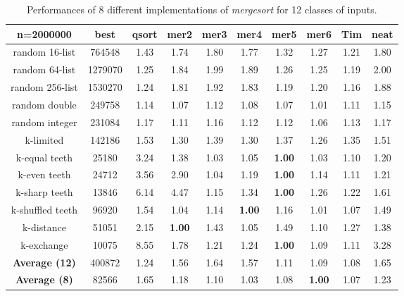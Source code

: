 \documentclass[AMA,STIX1COL]{WileyNJD-v2}
\newcommand{\msort}{\emph{mergesort }}
\begin{document}
\begin{table}
\caption{Performances of 8 different implementations of \msort for 12 classes of inputs.}
\centering
\begin{tabular}{|c|c|c|c|c|c|c|c|c|c|}
\toprule
n=2000000 & best  & qsort & mer2 & mer3 & mer4 & mer5 & mer6 & Tim & neat\\
\midrule
random 16-list	&764548&	1.43&	1.74&	1.80&	1.77&	1.32&	1.27&	1.21&	1.80\\
random 64-list&	1279070&	1.25&	1.84&	1.99&	1.89&	1.26&	1.25&	1.19&	2.00\\
random 256-list&	1530270&	1.24&	1.81&	1.92&	1.83&	1.19&	1.20&	1.16&	1.88\\
random double&	249758&	1.14&	1.07&	1.12&	1.08&	1.07&	1.01&	1.11&	1.15\\
random integer&	231084&	1.17&	1.11&	1.16&	1.12&	1.12&	1.06&	1.13&	1.17\\
k-limited&	142186&	1.53&	1.30&	1.39&	1.30&	1.37&	1.26&	1.35&	1.51\\
k-equal teeth&	25180&	3.24&	1.38&	1.03&	1.05&	\textbf{1.00}&	1.03&	1.10&	1.20\\
k-even teeth&	24712&	3.56&	2.90&	1.04&	1.19&	\textbf{1.00}&	1.14&	1.11&	1.21\\
k-sharp teeth&	13846&	6.14&	4.47&	1.15&	1.34&	\textbf{1.00}&	1.26&	1.22&	1.61\\
k-shuffled teeth&	96920&	1.54&	1.04&	1.14&	\textbf{1.00}&	1.16&	1.01&	1.07&	1.49\\
k-distance&	51051&	2.15&	\textbf{1.00}&	1.43&	1.05&	1.49&	1.10&	1.27&	1.38\\
k-exchange&	10075&	8.55&	1.78&	1.21&	1.24&	\textbf{1.00}&	1.09&	1.11&	3.28\\
\textbf{Average  (12)}&	400872&	1.24&	1.56&	1.64&	1.57&	1.11&	1.09&	1.08&	1.65\\
\textbf{Average  (8)}&	82566&	1.65&	1.18&	1.10&	1.03&	1.08&	\textbf{1.00}&	1.07&	1.23\\

\bottomrule
\end{tabular}
\label{table2}
\end{table}
\end{document}
